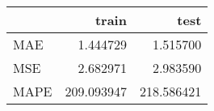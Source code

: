 \begin{tabular}{lrr}
\toprule
{} &       train &        test \\
\midrule
MAE  &    1.444729 &    1.515700 \\
MSE  &    2.682971 &    2.983590 \\
MAPE &  209.093947 &  218.586421 \\
\bottomrule
\end{tabular}
